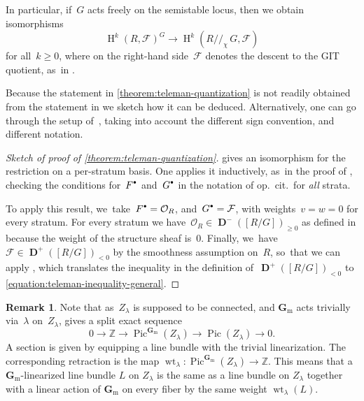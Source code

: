 \documentclass[JEP,XML,SOM,Unicode,NoEqCountersInSection,published]{cedram}
\newcommand{\sbullet}{{\scriptscriptstyle\bullet}}
\newcommand{\csbullet}{{\raisebox{1pt}{$\sbullet$}}}
\theoremstyle{plain}
\theoremstyle{definition}
\newtheorem{remark}[theorem]{Remark}
\DeclareMathOperator\derived{\mathbf{D}}
\DeclareMathOperator\HH{H}
\DeclareMathOperator\weight{wt}
\newcommand\Gm{\ensuremath{\mathbf{G}_{\mathrm{m}}}}
\begin{document}
In particular, if~$G$ acts freely on the semistable locus,
then we obtain isomorphisms
\begin{equation*}
\HH^k(R,\mathcal{F})^G \to \HH^k(R{/\!\!/_\chi}\,G,\mathcal{F})
\end{equation*}
for all~$k\geq 0$,
where on the right-hand side~$\mathcal{F}$ denotes the descent to the GIT quotient, as~in \cite[Th.\,3.2]{MR1792291}.

Because the statement in \cref{theorem:teleman-quantization}
is not readily obtained from the statement in \cite[Th.\,3.29]{MR3327537}
we sketch how it can be deduced.
Alternatively,
one can go through the setup of~\cite[Prop.\,2.11]{MR1792291},
taking into account the different sign convention,
and different notation.
\begin{proof}[Sketch of proof of \cref{theorem:teleman-quantization}]
\cite[Th.\,3.29]{MR3327537} gives an isomorphism for the restriction
on a per-stratum basis.
One applies it inductively, as~in the proof of \cite[Th.\,1.1]{MR3327537},
checking the conditions for~$F^\csbullet$ and~$G^\csbullet$
in the notation of op.~cit.~for \emph{all} strata.

To apply this result, we~take~$F^\csbullet=\mathcal{O}_R$,
and~$G^\csbullet=\mathcal{F}$,
with weights~$v=w=0$ for every stratum.
For every stratum we have~$\mathcal{O}_R\in\derived^-([R/G])_{\geq 0}$
as defined in \cite[Def.\,3.24]{MR3327537}
because the weight of the structure sheaf is~0.
Finally, we~have~$\mathcal{F}\in\derived^+([R/G])_{<0}$
by the smoothness assumption on~$R$, so~that we can apply \cite[Lem.\,2.9]{MR3327537},
which translates the inequality
in the definition of~$\derived^+([R/G])_{<0}$
to \eqref{equation:teleman-inequality-general}.
\end{proof}

\begin{remark}
\label{remark:weights}
Note that as~$Z_\lambda$ is supposed to be connected,
and $\Gm$ acts trivially via~$\lambda$ on~$Z_\lambda$,
\cite[Prop.\,2.10]{MR3329192} gives a split exact sequence
\begin{equation*}
0 \to \mathbb{Z} \to \operatorname{Pic}^{\Gm}(Z_\lambda) \to \operatorname{Pic}(Z_\lambda) \to 0.
\end{equation*}
A section is given by equipping a line bundle with the trivial linearization.
The corresponding retraction is the map $\weight_\lambda\colon \operatorname{Pic}^{\Gm}(Z_\lambda) \to \mathbb{Z}$.
This means that a $\Gm$\nobreakdash-lin\-earized line bundle $L$ on $Z_\lambda$
is the same as a line bundle on $Z_\lambda$ together with
a linear action of $\Gm$ on every fiber by the same weight $\weight_\lambda(L)$.
\end{remark}
\end{document}

